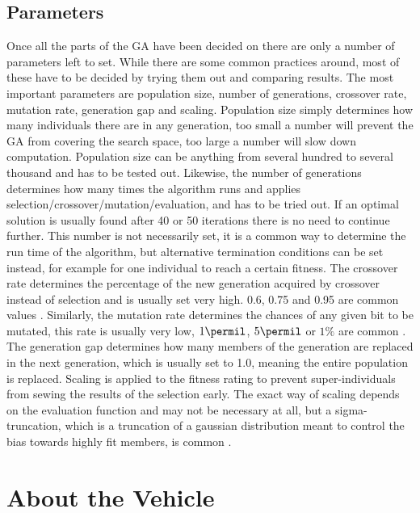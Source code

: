 \subsection{Parameters}
\label{sec:parameters}

Once all the parts of the GA have been decided on there are only a number of parameters left to set. While there are some common practices around, most of these have to be decided by trying them out and comparing results. The most important parameters are population size, number of generations, crossover rate, mutation rate, generation gap and scaling. Population size simply determines how many individuals there are in any generation, too small a number will prevent the GA from covering the search space, too large a number will slow down computation. Population size can be anything from several hundred to several thousand and has to be tested out. Likewise, the number of generations determines how many times the algorithm runs and applies selection/crossover/mutation/evaluation, and has to be tried out. If an optimal solution is usually found after 40 or 50 iterations there is no need to continue further. This number is not necessarily set, it is a common way to determine the run time of the algorithm, but alternative termination conditions can be set instead, for example for one individual to reach a certain fitness. The crossover rate determines the percentage of the new generation acquired by crossover instead of selection and is usually set very high. 0.6, 0.75 and 0.95 are common values \cite{20, 22,24}. Similarly, the mutation rate determines the chances of any given bit to be mutated, this rate is usually very low, $1\permil$, $5\permil$ or $1\%$ are common \cite{20,23,24}. The generation gap determines how many members of the generation are replaced in the next generation, which is usually set to 1.0, meaning the entire population is replaced. Scaling is applied to the fitness rating to prevent super-individuals from sewing the results of the selection early. The exact way of scaling depends on the evaluation function and may not be necessary at all, but a sigma-truncation, which is a truncation of a gaussian distribution meant to control the bias towards highly fit members, is common \cite{26}.

\section{About the Vehicle}
\label{sec:previous_knowledge_vehicle}

